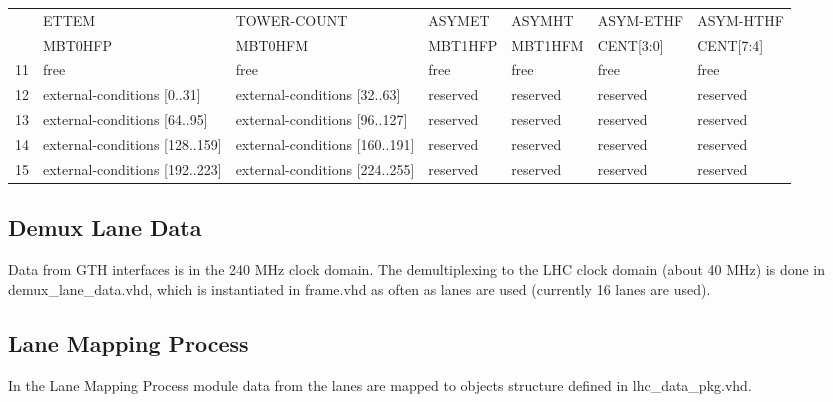 \begin{table}[ht]
\begin{tabular}{c|m{}|m{}|m{}|m{}|m{}|m{}|}
\multicolumn{1}{|c|}{} &
\multicolumn{1}{l|}{ETTEM} & TOWER-COUNT & ASYMET & ASYMHT & ASYM-ETHF & ASYM-HTHF \\
\multicolumn{1}{|c|}{} &
\multicolumn{1}{l|}{MBT0HFP} & MBT0HFM & MBT1HFP & MBT1HFM & CENT[3:0] & CENT[7:4] \\\hline
\multicolumn{1}{|c|}{11} & free & free & free & free & free & free \\\hline
\multicolumn{1}{|c|}{12} & external-conditions [0..31] & external-conditions [32..63] & reserved & reserved & reserved & reserved \\\hline
\multicolumn{1}{|c|}{13} & external-conditions [64..95] & external-conditions [96..127] & reserved & reserved & reserved & reserved \\\hline
\multicolumn{1}{|c|}{14} & external-conditions [128..159] & external-conditions [160..191] & reserved & reserved & reserved & reserved \\\hline
\multicolumn{1}{|c|}{15} & external-conditions [192..223] & external-conditions [224..255] & reserved & reserved & reserved & reserved \\\hline
\end{tabular}
\label{tab:framework:tab_configuration_optical_conn}
\end{table}

%
%

\subsection{Demux Lane Data} \label{sec:demux_lane_data}
Data from GTH interfaces is in the 240 MHz clock domain. The demultiplexing to the LHC clock domain (about 40 MHz) is done in demux\_lane\_data.vhd, which is instantiated
in frame.vhd as often as lanes are used (currently 16 lanes are used).

%
%

\subsection{Lane Mapping Process} \label{sec:lmp}
In the Lane Mapping Process module data from the lanes are mapped to objects structure defined in lhc\_data\_pkg.vhd.

